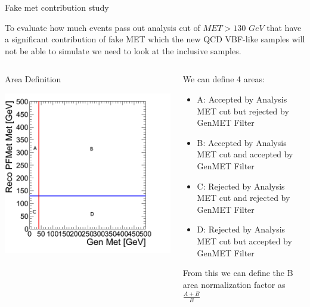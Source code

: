 \documentclass[8pt]{beamer}
\begin{document}
\begin{frame}{Fake met contribution study}
 
To evaluate how much events pass out analysis cut of $MET>130$ $GeV$ that have a significant contribution of fake MET 
which the new QCD VBF-like samples will not be able to simulate we need to look at the inclusive samples.

\begin{columns}
 
\begin{block}{Area Definition}
 
\includegraphics[width=\linewidth]{img/basic.png}
 
\end{block}

\begin{block}
 
We can define 4 areas:
\begin{itemize}
 \item A: Accepted by Analysis MET cut but rejected by GenMET Filter
 \item B: Accepted by Analysis MET cut and accepted by GenMET Filter
 \item C: Rejected by Analysis MET cut and rejected by GenMET Filter
 \item D: Rejected by Analysis MET cut but accepted by GenMET Filter
\end{itemize}

From this we can define the B area normalization factor as $\frac{A+B}{B}$

\end{block}

\end{columns}

\end{frame}
\end{document}
